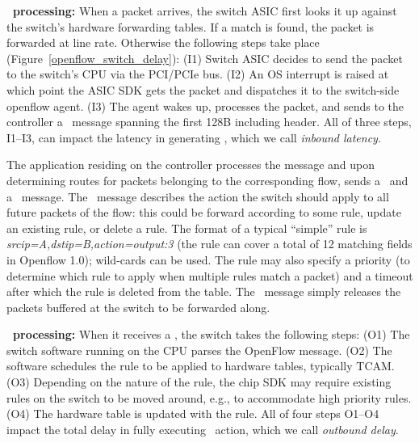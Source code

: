 {\bf \packetin\ processing: } When a packet arrives, the switch ASIC
first looks it up against the switch's hardware forwarding tables. If
a match is found, the packet is forwarded at line rate. Otherwise the
following steps take place (Figure~\ref{openflow_switch_delay}): (I1)
Switch ASIC decides to send the packet to the switch's CPU via the PCI/PCIe
bus. (I2) An OS interrupt is raised at which point the ASIC SDK gets
the packet and dispatches it to the switch-side openflow agent. (I3)
The agent wakes up, processes the packet, and sends to the controller
a \packetin\  message spanning the first 128B including header.
All of three steps, I1--I3,  can impact the latency in generating \packetin,
which we call {\em inbound   latency}. 

The application residing on the controller processes the message and
upon determining routes for packets belonging to the corresponding
flow, sends a \flowmod\ and a \packetout\ message. The \flowmod\
message describes the action the switch should apply to all future
packets of the flow: this could be forward according to some rule,
update an existing rule, or delete a rule. The format of a typical ``simple''
rule is \emph{srcip=A,dstip=B,action=output:3} (the rule can cover a total of 12 matching fields in Openflow 1.0); wild-cards can be used.
The rule may also specify a priority (to
determine which rule to apply when multiple rules match a packet) and
a timeout after which the rule is deleted from the table. The
\packetout\ message simply releases the packets buffered at the switch
to be forwarded along.

{\bf \flowmod\ processing: }
When it receives a \flowmod, the switch takes the following steps: (O1) The
switch software running on the CPU parses the OpenFlow message. (O2) The
software schedules the rule to be  applied to hardware tables, typically  TCAM.
(O3) Depending on the nature of the rule, the chip SDK may require
existing rules on the switch to be moved around, e.g., to accommodate
high priority rules. (O4) The hardware table is updated with the rule.
All of four steps O1--O4 impact the total delay in fully executing
\flowmod\ action, which we call {\em outbound delay}.

